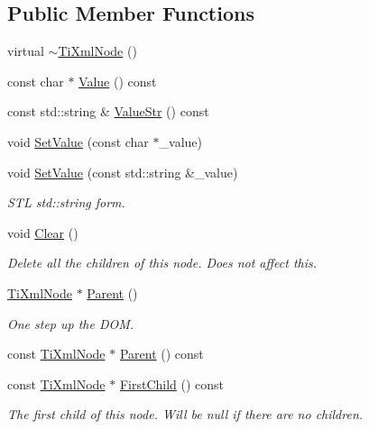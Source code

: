 \subsection*{Public Member Functions}
\begin{DoxyCompactItemize}
\item 
virtual \hyperlink{class_ti_xml_node_a027a76cccd359c831ee4024b58c49625}{$\sim$\+Ti\+Xml\+Node} ()
\item 
const char $\ast$ \hyperlink{class_ti_xml_node_ad44dfe927d49a74dd78b72b7514417ad}{Value} () const
\item 
const std\+::string \& \hyperlink{class_ti_xml_node_a74bda074919e4a5e08d700204793f898}{Value\+Str} () const
\item 
void \hyperlink{class_ti_xml_node_a2a38329ca5d3f28f98ce932b8299ae90}{Set\+Value} (const char $\ast$\+\_\+value)
\item 
void \hyperlink{class_ti_xml_node_a2598d5f448042c1abbeae4503dd45ff2}{Set\+Value} (const std\+::string \&\+\_\+value)
\begin{DoxyCompactList}\small\item\em S\+TL std\+::string form. \end{DoxyCompactList}\item 
void \hyperlink{class_ti_xml_node_a708e7f953df61d4d2d12f73171550a4b}{Clear} ()
\begin{DoxyCompactList}\small\item\em Delete all the children of this node. Does not affect \textquotesingle{}this\textquotesingle{}. \end{DoxyCompactList}\item 
\hyperlink{class_ti_xml_node}{Ti\+Xml\+Node} $\ast$ \hyperlink{class_ti_xml_node_ab643043132ffd794f8602685d34a982e}{Parent} ()
\begin{DoxyCompactList}\small\item\em One step up the D\+OM. \end{DoxyCompactList}\item 
const \hyperlink{class_ti_xml_node}{Ti\+Xml\+Node} $\ast$ \hyperlink{class_ti_xml_node_af13df38878a5798142693d01d6133ba0}{Parent} () const
\item 
const \hyperlink{class_ti_xml_node}{Ti\+Xml\+Node} $\ast$ \hyperlink{class_ti_xml_node_aa66bceae19707c90c1db12d7c98894a4}{First\+Child} () const
\begin{DoxyCompactList}\small\item\em The first child of this node. Will be null if there are no children. \end{DoxyCompactList}\item 

\end{DoxyCompactItemize}
